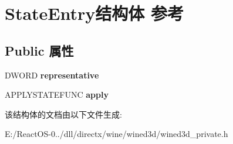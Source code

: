 \hypertarget{struct_state_entry}{}\section{State\+Entry结构体 参考}
\label{struct_state_entry}
\subsection*{Public 属性}
\begin{DoxyCompactItemize}
\item 
\mbox{\label{struct_state_entry_aad0156e1d9b2b588b4642a8a03dd33f0}} 
D\+W\+O\+RD {\bfseries representative}
\item 
\mbox{\label{struct_state_entry_a84ca0e826db25a2c231a02d0c7948711}} 
A\+P\+P\+L\+Y\+S\+T\+A\+T\+E\+F\+U\+NC {\bfseries apply}
\end{DoxyCompactItemize}


该结构体的文档由以下文件生成\+:\begin{DoxyCompactItemize}
\item 
E\+:/\+React\+O\+S-\/0../dll/directx/wine/wined3d/wined3d\+\_\+private.\+h\end{DoxyCompactItemize}
